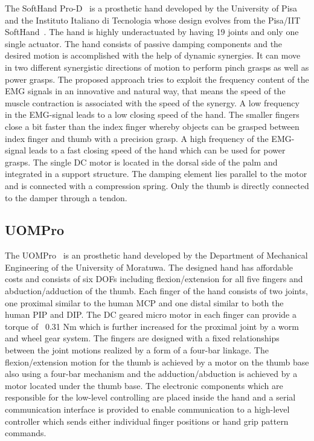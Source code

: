 \documentclass[a4paper, 10pt, conference]{ieeeconf}      %
\begin{document}
The SoftHand Pro-D~\cite{softhand} is a prosthetic hand developed by the University of Pisa and the Instituto Italiano di Tecnologia whose design evolves from the Pisa/IIT SoftHand~\cite{pisahand}. The hand is highly underactuated by having 19 joints and only one single actuator. The hand consists of passive damping components and the desired motion is accomplished with the help of dynamic synergies. It can move in two different synergistic directions of motion to perform pinch grasps as well as power grasps. The proposed approach tries to exploit the frequency content of the EMG signals in an innovative and natural way, that means the speed of the muscle contraction is associated with the speed of the synergy. A low frequency in the EMG-signal leads to a low closing speed of the hand. The smaller fingers close a bit faster than the index finger whereby objects can be grasped between index finger and thumb with a precision grasp. A high frequency of the EMG-signal leads to a fast closing speed of the hand which can be used for power grasps. The single DC motor is located in the dorsal side of the palm and integrated in a support structure. The damping element lies parallel to the motor and is connected with a compression spring. Only the thumb is directly connected to the damper through a tendon.


\subsection{UOMPro}

The UOMPro~\cite{uompro} is an prosthetic hand developed by the Department of Mechanical Engineering of the University of Moratuwa. The designed hand has affordable costs and consists of six DOFs including flexion/extension for all five fingers and abduction/adduction of the thumb. Each finger of the hand consists of two joints, one proximal similar to the human MCP and one distal similar to both the human PIP and DIP. The DC geared micro motor in each finger can provide a torque of ~0.31 Nm which is further increased for the proximal joint by a worm and wheel gear system. The fingers are designed with a fixed relationships between the joint motions realized by a form of a four-bar linkage. The flexion/extension motion for the thumb is achieved by a motor on the thumb base also using a four-bar mechanism and the adduction/abduction is achieved by a motor located under the thumb base. The electronic components which are responsible for the low-level controlling are placed inside the hand and a serial communication interface is provided to enable communication to a high-level controller which sends either individual finger positions or hand grip pattern commands.
\end{document}
